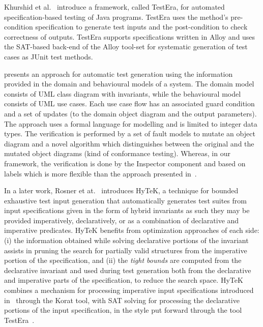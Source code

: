 Khurshid et al.~\cite{Khurshid2004} introduce a framework, called TestEra, for automated specification-based testing of Java programs. TestEra uses the method's pre-condition specification to generate test inputs and the post-condition to check correctness of outputs. TestEra supports specifications written in Alloy and uses the SAT-based back-end of the Alloy tool-set for systematic generation of test cases as JUnit test methods. 

\cite{Kaplan2008} presents an approach for automatic test generation using the information provided in the domain and behavioural models of a system. The domain model consists of UML class diagram with invariants, while the behavioural model consists of UML use cases. Each use case flow has an associated guard condition and a set of updates (to the domain object diagram and the output parameters). The approach uses a formal language for modelling and is limited to integer data types. The verification is performed by a set of fault models to mutate an object diagram and a novel algorithm which distinguishes between the original and the mutated object diagrams (kind of conformance testing). Whereas, in our framework, the verification is done by the Inspector component and based on labels which is more flexible than the approach presented in~\cite{Kaplan2008}.

In a later work, Rosner et at.~\cite{Rosner2014} introduces \textsf{HyTeK}, a technique for bounded exhaustive test input generation that automatically generates test suites from input
specifications given in the form of hybrid invariants as such they  may be provided imperatively, declaratively, or as a combination of declarative and imperative predicates. \textsf{HyTeK} benefits  from optimization approaches of each side: (i) the information obtained while solving declarative portions of the invariant assists in pruning the search for partially valid structures from the imperative portion of the specification, and (ii) the \textit{tight bounds} are computed from the declarative invariant and used   during test generation both from the declarative and imperative parts of the specification, to reduce the search space. \textsf{HyTeK} combines a mechanism for processing imperative input specifications introduced in~\cite{Boyapati2002} through the Korat tool, with SAT solving for processing the declarative portions of the input specification, in the style put forward through the tool TestEra~\cite{Khurshid2004}.

